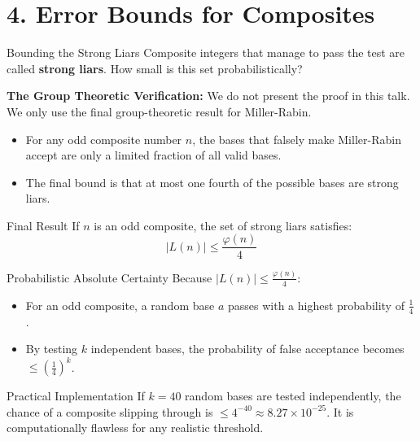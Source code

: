 \documentclass[10pt, compress]{beamer}
\begin{document}
\section{4. Error Bounds for Composites}
\begin{frame}{Bounding the Strong Liars}
    Composite integers that manage to pass the test are called \textbf{strong liars}. How small is this set probabilistically?
    
    \pause
    \textbf{The Group Theoretic Verification:}
    We do not present the proof in this talk. We only use the final group-theoretic result for Miller-Rabin.
    
    \pause
    \begin{itemize}
        \item For any odd composite number $n$, the bases that falsely make Miller-Rabin accept are only a limited fraction of all valid bases.
        \item The final bound is that at most one fourth of the possible bases are strong liars.
    \end{itemize}
    
    \pause
    \begin{block}{Final Result}
    If $n$ is an odd composite, the set of strong liars satisfies:
    \[ |L(n)| \le \frac{\varphi(n)}{4} \]
    \end{block}
\end{frame}
\begin{frame}{Probabilistic Absolute Certainty}
    Because $|L(n)| \le \frac{\varphi(n)}{4}$:
    \pause
    \begin{itemize}
        \item For an odd composite, a random base $a$ passes with a highest probability of $\frac{1}{4}$.
        \item By testing $k$ independent bases, the probability of false acceptance becomes $\le (\frac{1}{4})^k$.
    \end{itemize}
    
    \pause
    \begin{exampleblock}{Practical Implementation}
    If $k = 40$ random bases are tested independently, the chance of a composite slipping through is $\le 4^{-40} \approx 8.27 \times 10^{-25}$. It is computationally flawless for any realistic threshold.
    \end{exampleblock}
\end{frame}
\end{document}
